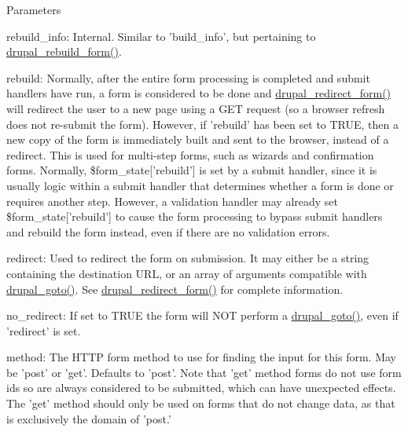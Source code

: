 \begin{DoxyParams}{Parameters}
\begin{DoxyItemize}
\begin{DoxyItemize}
\end{DoxyItemize}
\item rebuild\_\-info: Internal. Similar to 'build\_\-info', but pertaining to \hyperlink{group__form__api_ga72bc81db2eb72bbb1249a7c50d8614e7}{drupal\_\-rebuild\_\-form()}.
\item rebuild: Normally, after the entire form processing is completed and submit handlers have run, a form is considered to be done and \hyperlink{group__form__api_ga552fc91207f10c473d36bf3f9889506c}{drupal\_\-redirect\_\-form()} will redirect the user to a new page using a GET request (so a browser refresh does not re-\/submit the form). However, if 'rebuild' has been set to TRUE, then a new copy of the form is immediately built and sent to the browser, instead of a redirect. This is used for multi-\/step forms, such as wizards and confirmation forms. Normally, \$form\_\-state\mbox{[}'rebuild'\mbox{]} is set by a submit handler, since it is usually logic within a submit handler that determines whether a form is done or requires another step. However, a validation handler may already set \$form\_\-state\mbox{[}'rebuild'\mbox{]} to cause the form processing to bypass submit handlers and rebuild the form instead, even if there are no validation errors.
\item redirect: Used to redirect the form on submission. It may either be a string containing the destination URL, or an array of arguments compatible with \hyperlink{group__http__handling_ga5b68d7a934713d1d623b2b32a732235d}{drupal\_\-goto()}. See \hyperlink{group__form__api_ga552fc91207f10c473d36bf3f9889506c}{drupal\_\-redirect\_\-form()} for complete information.
\item no\_\-redirect: If set to TRUE the form will NOT perform a \hyperlink{group__http__handling_ga5b68d7a934713d1d623b2b32a732235d}{drupal\_\-goto()}, even if 'redirect' is set.
\item method: The HTTP form method to use for finding the input for this form. May be 'post' or 'get'. Defaults to 'post'. Note that 'get' method forms do not use form ids so are always considered to be submitted, which can have unexpected effects. The 'get' method should only be used on forms that do not change data, as that is exclusively the domain of 'post.'

\end{DoxyItemize}
\end{DoxyParams}
